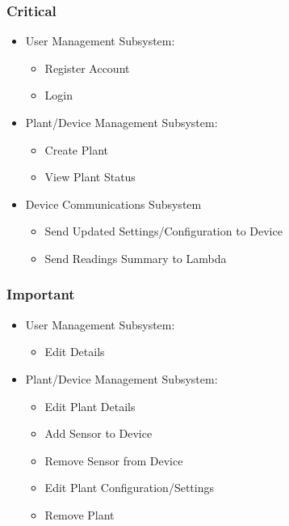 \documentclass{article}
\begin{document}
		\subsubsection{Critical}
			\begin{itemize}
				\item User Management Subsystem:
				\begin{itemize}
					\item Register Account
					\item Login
				\end{itemize}
				
				\item Plant/Device Management Subsystem:
				\begin{itemize}
					\item Create Plant
					\item View Plant Status
				\end{itemize}
				
				\item Device Communications Subsystem
				\begin{itemize}
					\item Send Updated Settings/Configuration to Device
					\item Send Readings Summary to Lambda
				\end{itemize}
			\end{itemize}
			
		\subsubsection{Important}
		\begin{itemize}
			\item User Management Subsystem:
			\begin{itemize}
				\item Edit Details
			\end{itemize}
			
			\item Plant/Device Management Subsystem:
			\begin{itemize}
				\item Edit Plant Details
				\item Add Sensor to Device
				\item Remove Sensor from Device
				\item Edit Plant Configuration/Settings
				\item Remove Plant
			\end{itemize}
		\end{itemize}
		
\end{document}
